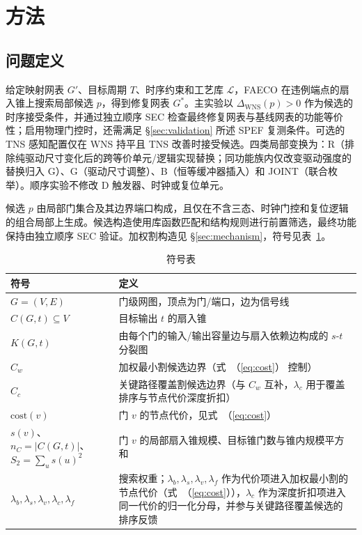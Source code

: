 \documentclass[twocolumn,10pt,fontset=windows]{ctexart}
\renewcommand{\eqref}[1]{\textup{（\ref{#1}）}}
\begin{document}
\section{方法}

\subsection{问题定义}
给定映射网表 $G'$、目标周期 $T$、时序约束和工艺库 $\mathcal{L}$，FAECO 在违例端点的扇入锥上搜索局部候选 $p$，得到修复网表 $G^*$。主实验以 $\Delta_{\mathrm{WNS}}(p)>0$ 作为候选的时序接受条件，并通过独立顺序 SEC 检查最终修复网表与基线网表的功能等价性；启用物理门控时，还需满足 \S\ref{sec:validation} 所述 SPEF 复测条件。可选的 TNS 感知配置仅在 WNS 持平且 TNS 改善时接受候选。四类局部变换为：R（排除纯驱动尺寸变化后的跨等价单元/逻辑实现替换；同功能族内仅改变驱动强度的替换归入 G）、G（驱动尺寸调整）、B（恒等缓冲器插入）和 JOINT（联合枚举）。顺序实验不修改 D 触发器、时钟或复位单元。

候选 $p$ 由局部门集合及其边界端口构成，且仅在不含三态、时钟门控和复位逻辑的组合局部上生成。候选构造使用库函数匹配和结构规则进行前置筛选，最终功能保持由独立顺序 SEC 验证。加权割构造见 \S\ref{sec:mechanism}，符号见表~\ref{tab:symbols}。

\begin{table}[ht]
\centering
\caption{符号表}
\label{tab:symbols}
\scriptsize
\setlength{\tabcolsep}{2pt}
\renewcommand{\arraystretch}{0.9}
\begin{tabular}{p{2.6cm}p{4.9cm}}
\toprule
\textbf{符号} & \textbf{定义} \\
\midrule
$G = (V, E)$ & 门级网图，顶点为门/端口，边为信号线 \\
$C(G, t) \subseteq V$ & 目标输出 $t$ 的扇入锥 \\
$K(G, t)$ & 由每个门的输入/输出容量边与扇入依赖边构成的 $s$-$t$ 分裂图 \\
$C_w$ & 加权最小割候选边界（式~\eqref{eq:cost} 控制） \\
$C_c$ & 关键路径覆盖割候选边界（与 $C_w$ 互补，$\lambda_c$ 用于覆盖排序与节点代价深度折扣） \\
$\mathrm{cost}(v)$ & 门 $v$ 的节点代价，见式~\eqref{eq:cost} \\
$s(v)$、$n_C=|C(G,t)|$、$S_2=\sum_u s(u)^2$ & 门 $v$ 的局部扇入锥规模、目标锥门数与锥内规模平方和 \\
$\lambda_b,\lambda_s,\lambda_v,\lambda_c,\lambda_f$ & 搜索权重；$\lambda_b,\lambda_s,\lambda_v,\lambda_f$ 作为代价项进入加权最小割的节点代价（式~\eqref{eq:cost}），$\lambda_c$ 作为深度折扣项进入同一代价的归一化分母，并参与关键路径覆盖候选的排序反馈 \\
\bottomrule
\end{tabular}
\end{table}
\end{document}
